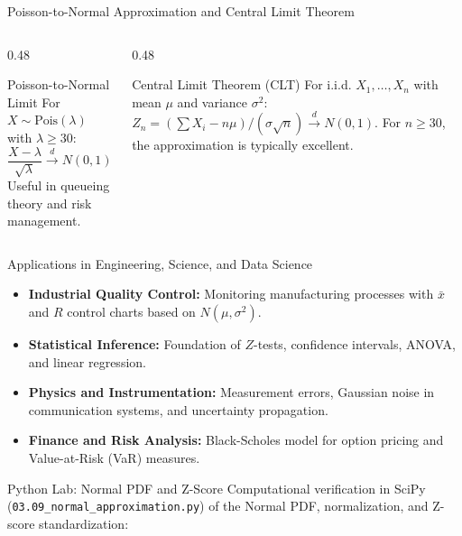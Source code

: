 \documentclass[aspectratio=169,xcolor={dvipsnames,table}]{beamer}
\begin{document}
\begin{frame}{Poisson-to-Normal Approximation and Central Limit Theorem}
	\vspace{-0.15cm}
	\begin{columns}[T]
		\begin{column}{0.48\textwidth}
			\begin{block}{Poisson-to-Normal Limit}
				\footnotesize
				For $X \sim \text{Pois}(\lambda)$ with $\lambda \ge 30$:
				$$\dfrac{X - \lambda}{\sqrt{\lambda}} \xrightarrow{d} N(0, 1) \quad \text{as } \lambda \to \infty$$
				Useful in queueing theory and risk management.
			\end{block}
		\end{column}
		\begin{column}{0.48\textwidth}
			\begin{alertblock}{Central Limit Theorem (CLT)}
				\footnotesize
				For i.i.d. $X_{1}, \dots, X_{n}$ with mean $\mu$ and variance $\sigma^{2}$:
				$Z_{n} = (\sum X_{i} - n\mu) / (\sigma\sqrt{n}) \xrightarrow{d} N(0, 1)$.
				For $n \ge 30$, the approximation is typically excellent.
			\end{alertblock}
		\end{column}
	\end{columns}
\end{frame}

\begin{frame}{Applications in Engineering, Science, and Data Science}
	\vspace{-0.1cm}
	\begin{itemize}\itemsep=0.1cm
		\item \textbf{Industrial Quality Control:} Monitoring manufacturing processes with $\bar{x}$ and $R$ control charts based on $N(\mu, \sigma^{2})$. \pause
		\item \textbf{Statistical Inference:} Foundation of $Z$-tests, confidence intervals, ANOVA, and linear regression. \pause
		\item \textbf{Physics and Instrumentation:} Measurement errors, Gaussian noise in communication systems, and uncertainty propagation. \pause
		\item \textbf{Finance and Risk Analysis:} Black-Scholes model for option pricing and Value-at-Risk (VaR) measures.
	\end{itemize}
\end{frame}

\begin{frame}[fragile]{Python Lab: Normal PDF and Z-Score}
	\vspace{-0.05cm}
	\scriptsize
	Computational verification in SciPy (\texttt{03.09\_normal\_approximation.py}) of the Normal PDF, normalization, and Z-score standardization:
	\vspace{0.02cm}
	{
	}
\end{frame}
\end{document}
